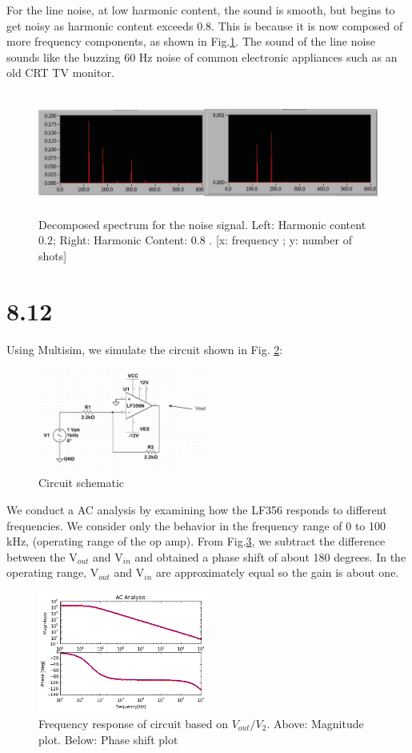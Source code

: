 \documentclass[authoryear, 12pt,5p, times]{elsarticle}
\begin{document}
\par For the line noise, at low harmonic content, the sound is smooth, but begins to get noisy as harmonic content exceeds 0.8. This is because it is now composed of more frequency components, as shown in Fig.\ref{line}. The sound of the line noise sounds like the buzzing 60 Hz noise of common electronic appliances such as an old CRT TV monitor.
 \begin{figure}[h!]
\includegraphics[width=\textwidth,height=4cm]{figure/line.png}
\caption{Decomposed spectrum for the noise signal. Left: Harmonic content 0.2; Right: Harmonic Content: 0.8 . [x: frequency ; y: number of shots] }
\label{line}
 \end{figure}
\section*{8.12}
Using Multisim, we simulate the circuit shown in Fig. \ref{schema8_12}: 
 \begin{figure}[h!]
 \centering
  \includegraphics[width=0.5\textwidth]{figure/8_12_schematic.JPG} 
\caption{Circuit schematic}
\label{schema8_12}
 \end{figure}
We conduct a AC analysis by examining how the LF356 responds to different frequencies. We consider only the behavior in the frequency range of 0 to 100 kHz, (operating range of the op amp). From Fig.\ref{phase}, we subtract the difference between the V$_{out}$ and V$_{in}$ and obtained a phase shift of about 180 degrees. In the operating range, V$_{out}$ and V$_{in}$ are approximately equal so the gain is about one.
 \begin{figure}[h!]
 \centering
  \includegraphics[width=0.5\textwidth]{figure/8_12_phase_shift.JPG} 
\caption{Frequency response of circuit based on $V_{out}/V_{2}$. Above: Magnitude plot. Below: Phase shift plot}
\label{phase}
 \end{figure}
\end{document}
